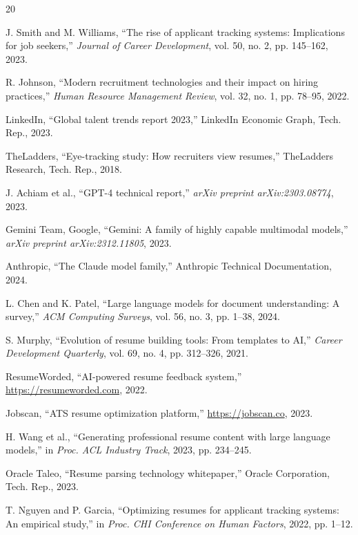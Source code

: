 \documentclass[conference]{IEEEtran}
\begin{document}
\begin{thebibliography}{20}

J. Smith and M. Williams, ``The rise of applicant tracking systems: Implications for job seekers,'' \textit{Journal of Career Development}, vol. 50, no. 2, pp. 145--162, 2023.

R. Johnson, ``Modern recruitment technologies and their impact on hiring practices,'' \textit{Human Resource Management Review}, vol. 32, no. 1, pp. 78--95, 2022.

LinkedIn, ``Global talent trends report 2023,'' LinkedIn Economic Graph, Tech. Rep., 2023.

TheLadders, ``Eye-tracking study: How recruiters view resumes,'' TheLadders Research, Tech. Rep., 2018.

J. Achiam et al., ``GPT-4 technical report,'' \textit{arXiv preprint arXiv:2303.08774}, 2023.

Gemini Team, Google, ``Gemini: A family of highly capable multimodal models,'' \textit{arXiv preprint arXiv:2312.11805}, 2023.

Anthropic, ``The Claude model family,'' Anthropic Technical Documentation, 2024.

L. Chen and K. Patel, ``Large language models for document understanding: A survey,'' \textit{ACM Computing Surveys}, vol. 56, no. 3, pp. 1--38, 2024.

S. Murphy, ``Evolution of resume building tools: From templates to AI,'' \textit{Career Development Quarterly}, vol. 69, no. 4, pp. 312--326, 2021.

ResumeWorded, ``AI-powered resume feedback system,'' \url{https://resumeworded.com}, 2022.

Jobscan, ``ATS resume optimization platform,'' \url{https://jobscan.co}, 2023.

H. Wang et al., ``Generating professional resume content with large language models,'' in \textit{Proc. ACL Industry Track}, 2023, pp. 234--245.

Oracle Taleo, ``Resume parsing technology whitepaper,'' Oracle Corporation, Tech. Rep., 2023.

T. Nguyen and P. Garcia, ``Optimizing resumes for applicant tracking systems: An empirical study,'' in \textit{Proc. CHI Conference on Human Factors}, 2022, pp. 1--12.


\end{thebibliography}
\end{document}
